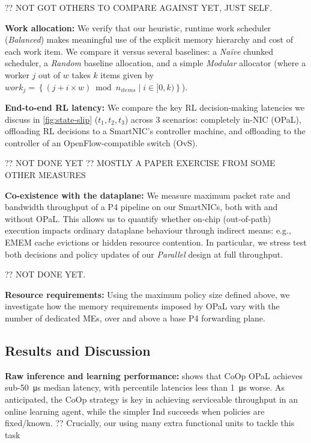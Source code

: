 \documentclass[sigconf,natbib=false]{acmart}
\newcommand{\fakepara}[1]{\noindent\textbf{#1:}}
\newcommand{\approachshort}{OPaL}
\newcommand{\Coopfw}{CoOp}
\newcommand{\Indfw}{Ind}
\begin{document}
?? NOT GOT OTHERS TO COMPARE AGAINST YET, JUST SELF.

\fakepara{Work allocation}
We verify that our heuristic, runtime work scheduler (\emph{Balanced}) makes meaningful use of the explicit memory hierarchy and cost of each work item.
We compare it versus several baselines: a \emph{Na\"{i}ve} chunked scheduler, a \emph{Random} baseline allocation, and a simple \emph{Modular} allocator (where a worker $j$ out of $w$ takes $k$ items given by $\mathit{work}_j=\left\{\left(j + i \times w\right) \bmod n_{\mathit{items}} \mid i \in [0,k) \right\}$).

\fakepara{End-to-end RL latency}
We compare the key RL decision-making latencies we discuss in \cref{fig:state-slip} ($t_1,t_2,t_3$) across 3 scenarios: completely in-NIC (\approachshort{}), offloading RL decisions to a SmartNIC's controller machine, and offloading to the controller of an OpenFlow-compatible switch (OvS).

?? NOT DONE YET
?? MOSTLY A PAPER EXERCISE FROM SOME OTHER MEASURES

\fakepara{Co-existence with the dataplane}
We measure maximum packet rate and bandwidth throughput of a P4 pipeline on our SmartNICs, both with and without \approachshort{}.
This allows us to quantify whether on-chip (out-of-path) execution impacts ordinary dataplane behaviour through indirect means: e.g., EMEM cache evictions or hidden resource contention.
In particular, we stress test both decisions and policy updates of our \emph{Parallel} design at full throughput.

?? NOT DONE YET.

\fakepara{Resource requirements}
Using the maximum policy size defined above, we investigate how the memory requirements imposed by \approachshort{} vary with the number of dedicated MEs, over and above a base P4 forwarding plane.


\subsection{Results and Discussion}\label{sec:results}
\fakepara{Raw inference and learning performance}
 shows that \Coopfw{} \approachshort{} achieves sub-\SI{50}{\micro\second} median latency, with  percentile latencies less than \SI{1}{\micro\second} worse.
As anticipated, the \Coopfw{} strategy is key in achieving serviceable throughput in an online learning agent, while the simpler \Indfw{} succeeds when policies are fixed/known.
?? Crucially, our using many extra functional units to tackle this task
\end{document}
